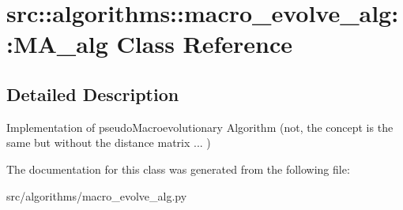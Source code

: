 \hypertarget{classsrc_1_1algorithms_1_1macro__evolve__alg_1_1MA__alg}{
\section{src::algorithms::macro\_\-evolve\_\-alg::MA\_\-alg Class Reference}
\label{classsrc_1_1algorithms_1_1macro__evolve__alg_1_1MA__alg}
}


\subsection{Detailed Description}
\begin{DoxyVerb}
  Implementation of pseudoMacroevolutionary Algorithm
  (not, the concept is the same but without the distance matrix ... )
  \end{DoxyVerb}
 

The documentation for this class was generated from the following file:\begin{DoxyCompactItemize}
\item 
src/algorithms/macro\_\-evolve\_\-alg.py\end{DoxyCompactItemize}
